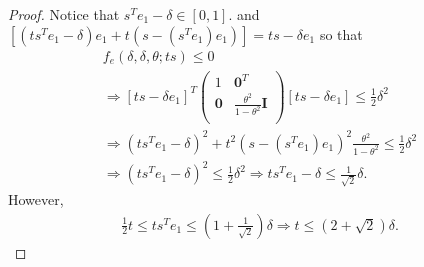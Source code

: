 \begin{proof}
Notice that $s^Te_1 - \delta \in \left[0, 1\right]$.
and $\left[\left(ts^Te_1 - \delta\right) e_1 + t\left(s - \left(s^Te_1\right) e_1\right)\right] = ts - \delta e_1$
so that
\begin{align*}
f_e(\delta, \delta, \theta; ts) \le 0 \\
\Longrightarrow 
\left[ts - \delta e_1\right]^T\begin{pmatrix}
1 & \boldsymbol0^T \\
\boldsymbol 0 & \frac{\theta^2}{1 - \theta^2} \boldsymbol I \\
\end{pmatrix} \left[ts - \delta e_1\right] \le \frac 1 2 \delta^2 \\
\Longrightarrow
\left(ts^Te_1 - \delta\right)^2 + t^2\left(s - \left(s^Te_1\right) e_1\right)^2  \frac{\theta^2}{1 - \theta^2} \le \frac 1 2 \delta^2 \\
\Longrightarrow 
\left(t s^Te_1 - \delta\right)^2 \le \frac 1 2 \delta^2 
\Longrightarrow t s^Te_1 - \delta \le \frac 1 {\sqrt{2}} \delta.
\end{align*}
However,
\begin{align*}
\frac 1 2 t \le t s^Te_1 \le \left(1 + \frac 1 {\sqrt{2}}\right) \delta
\Longrightarrow t \le \left(2 + \sqrt{2}\right) \delta.
\end{align*}
\end{proof}





